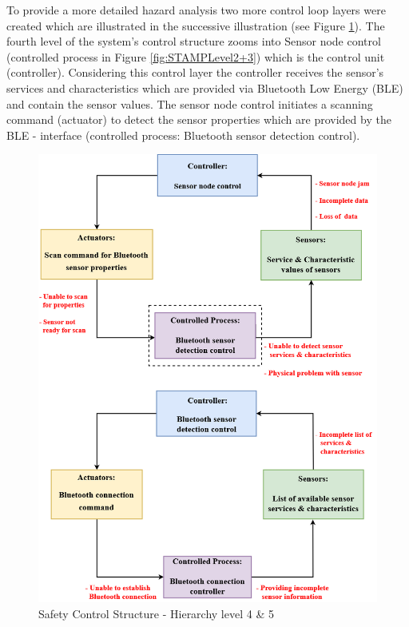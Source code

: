 \documentclass[review]{elsarticle}
\begin{document}
\begin{itemize}
 	To provide a more detailed hazard analysis two more control loop layers were created which are illustrated in the successive illustration (see Figure  \ref{fig:STAMPLevel4+5}). The fourth level of the system's control structure zooms into Sensor node control (controlled process in Figure \ref{fig:STAMPLevel2+3}) which is the control unit (controller). Considering this control layer the controller receives the sensor's services and characteristics which are provided via Bluetooth Low Energy (BLE) and contain the sensor values. The sensor node control initiates a scanning command (actuator) to detect the sensor properties which are provided by the BLE - interface (controlled process: Bluetooth sensor detection control).  
	
	\begin{figure}[!ht]
		\centering
		\includegraphics[scale=0.36]{Images/STAMP4+5level(2)}
		\caption[Safety Control Structure - Hierarchy level 4 \& 5]{Safety Control Structure - Hierarchy level 4 \& 5}
		\label{fig:STAMPLevel4+5}
	\end{figure}
    \newpage
    

\end{itemize}
\end{document}
